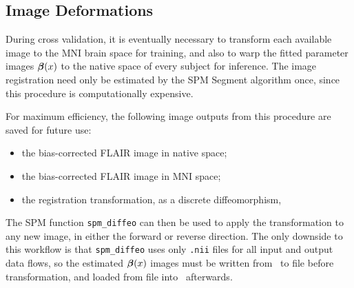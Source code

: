 \subsection{Image Deformations}\label{ss:spmdeform}
During cross validation,
it is eventually necessary to transform each available image to the MNI brain space for training,
and also to warp the fitted parameter images $\bm{\beta}(x)$
to the native space of every subject for inference.
The image registration need only be estimated by the SPM Segment algorithm once,
since this procedure is computationally expensive.
\par
For maximum efficiency, the following image outputs from this procedure are saved for future use:
\begin{itemize}[itemsep=0pt,topsep=0pt]
  \item the bias-corrected FLAIR image in native space;
  \item the bias-corrected FLAIR image in MNI space;
  \item the registration transformation, as a discrete diffeomorphism,
\end{itemize}
The SPM function \texttt{spm\_diffeo} can then be used
to apply the transformation to any new image, in either the forward or reverse direction.
The only downside to this workflow is that
\texttt{spm\_diffeo} uses only \texttt{.nii} files for all input and output data flows,
so the estimated $\bm{\beta}(x)$ images must be written from \matlab\ to file before transformation,
and loaded from file into \matlab\ afterwards.
